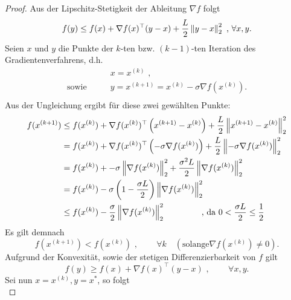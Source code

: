 \begin{proof}
  Aus der Lipschitz-Stetigkeit der Ableitung $\nabla f$ folgt
  \begin{equation*}
      f(y) \leq f(x) + \nabla f(x)^\top (y-x) + \frac{L}{2} \left\lVert y-x\right\rVert^2_2 \text{ , } \forall x,y \text{.}
  \end{equation*}
  Seien $x$ und $y$ die Punkte der $k$-ten bzw. $(k-1)$-ten Iteration des Gradientenverfahrens, d.h.
  \begin{align*}
     & x = x^{(k)} \text{ ,}\\
    \text{sowie} \qquad & y = x^{(k+1)} = x^{(k)} - \sigma \nabla f(x^{(k)}) \text{.}\\
  \end{align*}
  Aus der Ungleichung ergibt für diese zwei gewählten Punkte:\\
    \begin{gather*}
      			\begin{aligned}
              f(x^{(k+1)}) & \leq f(x^{(k)}) + \nabla f(x^{(k)})^\top \left(x^{(k+1)}-x^{(k)}\right) + \frac{L}{2} \left\lVert x^{(k+1)}-x^{(k)}\right\rVert^2_2 \\
              & =f(x^{(k)}) + \nabla f(x^{(k)})^\top \left(-\sigma \nabla f(x^{(k)})\right) + \frac{L}{2} \left\lVert-\sigma \nabla f(x^{(k)})\right\rVert^2_2 \\
              & = f(x^{(k)}) + -\sigma \left\lVert\nabla f(x^{(k)})\right\rVert^2_2 + \frac{\sigma ^2 L}{2} \left\lVert\nabla f(x^{(k)})\right\rVert^2_2 \\
              & = f(x^{(k)}) - \sigma \left(1 - \frac{\sigma L}{2}\right)\left\lVert\nabla f(x^{(k)})\right\rVert^2_2 \\
              & \leq f(x^{(k)}) - \frac{\sigma}{2} \left\lVert\nabla f(x^{(k)})\right\rVert^2_2 \qquad \qquad \text{  ,   da } 0 < \frac{\sigma L}{2} \leq \frac{1}{2} \\
      			\end{aligned}
    	\end{gather*}
      Es gilt demnach
      \begin{equation*}
        f(x^{(k+1)}) < f(x^{(k)}) \text{ , } \qquad \forall k \quad (\text{solange} \nabla f(x^{(k)}) \neq 0)\text{.}
      \end{equation*}
      Aufgrund der Konvexität, sowie der stetigen Differenzierbarkeit von $f$ gilt
      \begin{equation*}
        f(y) \geq f(x) + \nabla f(x)^\top (y-x) \text{ , }\qquad \forall x,y \text{.}
      \end{equation*}
      Sei nun $x=x^{(k)}, y=x^\ast$, so folgt
      \begin{equation*}

\end{equation*}
\end{proof}
